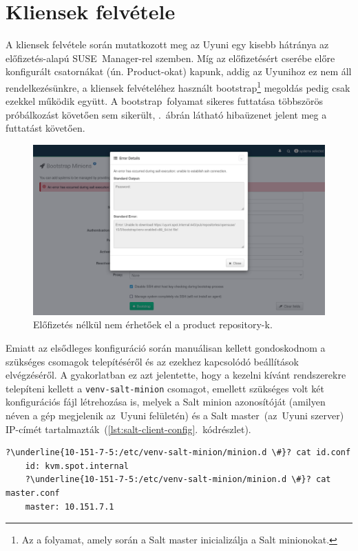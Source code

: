 \section{Kliensek felvétele}
A kliensek felvétele során mutatkozott meg az Uyuni egy kisebb hátránya az előfizetés-alapú SUSE~Manager-rel szemben. Míg az előfizetésért cserébe előre konfigurált csatornákat (ún. Product-okat) kapunk, addig az Uyunihoz ez nem áll rendelkezésünkre, a kliensek felvételéhez használt bootstrap\footnote{Az a folyamat, amely során a Salt master inicializálja a Salt minionokat.} megoldás pedig csak ezekkel működik együtt. A bootstrap~folyamat sikeres futtatása többszörös próbálkozást követően sem sikerült, .~ábrán látható hibaüzenet jelent meg a futtatást követően.

\begin{figure}[ht]
	\centering
	\includegraphics[width=15cm]{figures/uyuni-bootstrap-error.png}
	\caption{Előfizetés nélkül nem érhetőek el a product repository-k.}
	\label{fig:uyuni-bootstrap-error}
\end{figure}

Emiatt az elsődleges konfiguráció során manuálisan kellett gondoskodnom a szükséges csomagok telepítéséről és az ezekhez kapcsolódó beállítások elvégzéséről. A gyakorlatban ez azt jelentette, hogy a kezelni kívánt rendszerekre telepíteni kellett a \texttt{venv-salt-minion} csomagot, emellett szükséges volt két konfigurációs fájl létrehozása is, melyek a Salt minion azonosítóját (amilyen néven a gép megjelenik az~Uyuni felületén) és a Salt master~(az~Uyuni szerver) IP-címét tartalmazták~(\ref{lst:salt-client-config}.~kódrészlet).

\vspace{2mm}
\begin{lstlisting}[caption=A manuális konfiguráció során létrehozott állományok tartalma.,label=lst:salt-client-config,escapechar=?]
	?\underline{10-151-7-5:/etc/venv-salt-minion/minion.d \#}? cat id.conf
	id: kvm.spot.internal
	?\underline{10-151-7-5:/etc/venv-salt-minion/minion.d \#}? cat master.conf
	master: 10.151.7.1
\end{lstlisting}

